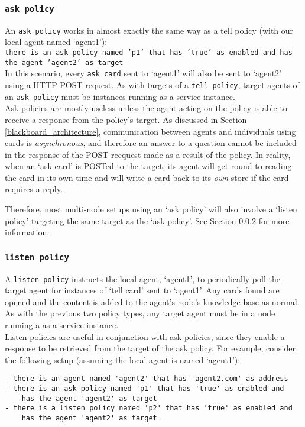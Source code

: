 \documentclass{scrartcl}
\begin{document}
\subsubsection{\texttt{ask policy}}
An \texttt{ask policy} works in almost exactly the same way as a tell policy (with our local agent named `agent1'):\\
\texttt{there is an ask policy named 'p1' that has 'true' as enabled and has the agent 'agent2' as target}\\

In this scenario, every \texttt{ask card} sent to `agent1' will also be sent to `agent2' using a HTTP POST request. As with targets of a \texttt{tell policy}, target agents of an \texttt{ask policy} must be instances running as a service instance.\\

Ask policies are mostly useless unless the agent acting on the policy is able to receive a response from the policy's target. As discussed in Section \ref{blackboard_architecture}, communication between agents and individuals using cards is \textit{asynchronous}, and therefore an answer to a question cannot be included in the response of the POST reequest made as a result of the policy. In reality, when an `ask card' is POSTed to the target, its agent will get round to reading the card in its own time and will write a card back to its \textit{own} store if the card requires a reply.

Therefore, most multi-node setups using an `ask policy' will also involve a `listen policy' targeting the same target as the `ask policy'. See Section \ref{listen_policy} for more information.

\subsubsection{\texttt{listen policy}}
\label{listen_policy}
A \texttt{listen policy} instructs the local agent, `agent1', to periodically poll the target agent for instances of `tell card' sent to `agent1'. Any cards found are opened and the content is added to the agent's node's knowledge base as normal.\\

As with the previous two policy types, any target agent must be in a node running a as a service instance.\\

Listen policies are useful in conjunction with ask policies, since they enable a response to be retrieved from the target of the ask policy. For example, consider the following setup (assuming the local agent is named `agent1'):\\
\begin{verbatim}
- there is an agent named 'agent2' that has 'agent2.com' as address
- there is an ask policy named 'p1' that has 'true' as enabled and
    has the agent 'agent2' as target
- there is a listen policy named 'p2' that has 'true' as enabled and
    has the agent 'agent2' as target
\end{verbatim}
\end{document}
